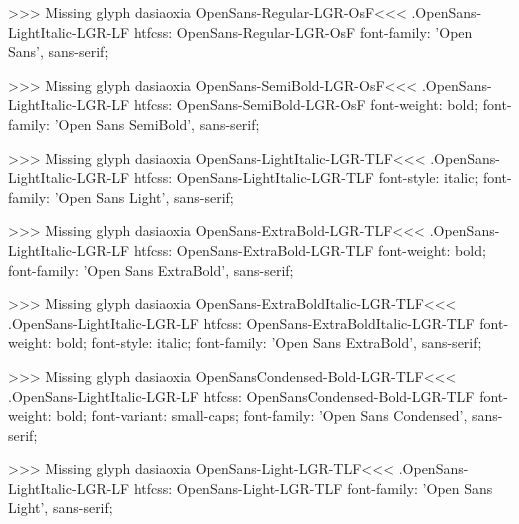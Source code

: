 >>>
Missing glyph	dasiaoxia
\<OpenSans-Regular-LGR-OsF\><<<
.OpenSans-LightItalic-LGR-LF
htfcss:  OpenSans-Regular-LGR-OsF  font-family: 'Open Sans', sans-serif;

>>>
Missing glyph	dasiaoxia
\<OpenSans-SemiBold-LGR-OsF\><<<
.OpenSans-LightItalic-LGR-LF
htfcss:  OpenSans-SemiBold-LGR-OsF  font-weight: bold; font-family: 'Open Sans SemiBold', sans-serif;

>>>
Missing glyph	dasiaoxia
\<OpenSans-LightItalic-LGR-TLF\><<<
.OpenSans-LightItalic-LGR-LF
htfcss:  OpenSans-LightItalic-LGR-TLF  font-style: italic; font-family: 'Open Sans Light', sans-serif;

>>>
Missing glyph	dasiaoxia
\<OpenSans-ExtraBold-LGR-TLF\><<<
.OpenSans-LightItalic-LGR-LF
htfcss:  OpenSans-ExtraBold-LGR-TLF  font-weight: bold; font-family: 'Open Sans ExtraBold', sans-serif;

>>>
Missing glyph	dasiaoxia
\<OpenSans-ExtraBoldItalic-LGR-TLF\><<<
.OpenSans-LightItalic-LGR-LF
htfcss:  OpenSans-ExtraBoldItalic-LGR-TLF  font-weight: bold; font-style: italic; font-family: 'Open Sans ExtraBold', sans-serif;

>>>
Missing glyph	dasiaoxia
\<OpenSansCondensed-Bold-LGR-TLF\><<<
.OpenSans-LightItalic-LGR-LF
htfcss:  OpenSansCondensed-Bold-LGR-TLF  font-weight: bold; font-variant: small-caps; font-family: 'Open Sans Condensed', sans-serif;

>>>
Missing glyph	dasiaoxia
\<OpenSans-Light-LGR-TLF\><<<
.OpenSans-LightItalic-LGR-LF
htfcss:  OpenSans-Light-LGR-TLF  font-family: 'Open Sans Light', sans-serif;

